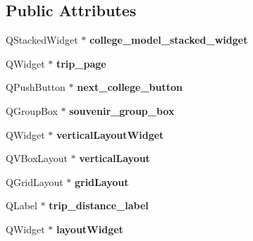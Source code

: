 \subsection*{Public Attributes}
\begin{DoxyCompactItemize}
\item 
\mbox{\label{class_ui___college_model_a5e12a43e4b076638884cb3a9b6fa5829}} 
Q\+Stacked\+Widget $\ast$ {\bfseries college\+\_\+model\+\_\+stacked\+\_\+widget}
\item 
\mbox{\label{class_ui___college_model_aa888e05de98f70d3e671b9f3dd756341}} 
Q\+Widget $\ast$ {\bfseries trip\+\_\+page}
\item 
\mbox{\label{class_ui___college_model_a855d636108b9966f9dba7af960afae12}} 
Q\+Push\+Button $\ast$ {\bfseries next\+\_\+college\+\_\+button}
\item 
\mbox{\label{class_ui___college_model_aeb428c3b9e1441a8dd583990a9276ac6}} 
Q\+Group\+Box $\ast$ {\bfseries souvenir\+\_\+group\+\_\+box}
\item 
\mbox{\label{class_ui___college_model_afddeae1cc8ee19be345846e7ed232fa6}} 
Q\+Widget $\ast$ {\bfseries vertical\+Layout\+Widget}
\item 
\mbox{\label{class_ui___college_model_a09de040d3b700cc0085f868212520549}} 
Q\+V\+Box\+Layout $\ast$ {\bfseries vertical\+Layout}
\item 
\mbox{\label{class_ui___college_model_aae99167d3e36075850253e42bf517a87}} 
Q\+Grid\+Layout $\ast$ {\bfseries grid\+Layout}
\item 
\mbox{\label{class_ui___college_model_a50f9c221f77d276514e53080dac0e3b5}} 
Q\+Label $\ast$ {\bfseries trip\+\_\+distance\+\_\+label}
\item 
\mbox{\label{class_ui___college_model_aad4c78b139b0ad7a529fb521fff62493}} 
Q\+Widget $\ast$ {\bfseries layout\+Widget}
\item 
\mbox{\label{class_ui___college_model_af7e7adfc112d0cad9cd8976c33beab42}} 

\end{DoxyCompactItemize}
